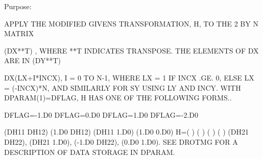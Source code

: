 \begin{DoxyParagraph}{Purpose\+: }
\begin{DoxyVerb}    APPLY THE MODIFIED GIVENS TRANSFORMATION, H, TO THE 2 BY N MATRIX

    (DX**T) , WHERE **T INDICATES TRANSPOSE. THE ELEMENTS OF DX ARE IN
    (DY**T)

    DX(LX+I*INCX), I = 0 TO N-1, WHERE LX = 1 IF INCX .GE. 0, ELSE
    LX = (-INCX)*N, AND SIMILARLY FOR SY USING LY AND INCY.
    WITH DPARAM(1)=DFLAG, H HAS ONE OF THE FOLLOWING FORMS..

    DFLAG=-1.D0     DFLAG=0.D0        DFLAG=1.D0     DFLAG=-2.D0

      (DH11  DH12)    (1.D0  DH12)    (DH11  1.D0)    (1.D0  0.D0)
    H=(          )    (          )    (          )    (          )
      (DH21  DH22),   (DH21  1.D0),   (-1.D0 DH22),   (0.D0  1.D0).
    SEE DROTMG FOR A DESCRIPTION OF DATA STORAGE IN DPARAM.\end{DoxyVerb}
 
\end{DoxyParagraph}

